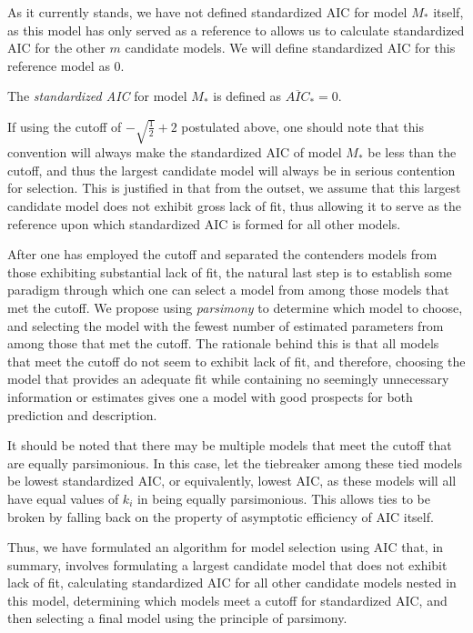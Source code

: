 		As it currently stands, we have not defined standardized AIC for model $M_*$ itself, as this model has only served as a reference to allows us to calculate standardized AIC for the
		other $m$ candidate models. We will define standardized AIC for this reference model as $0$.
		\begin{definition}
			The \textit{standardized AIC} for model $M_*$ is defined as $\overline{AIC}_* = 0$.
		\end{definition}
		If using the cutoff of $-\sqrt{\frac{1}{2}} + 2$ postulated above, one should note that this convention will always make the standardized AIC of model $M_*$ be less than the
		cutoff, and thus the largest candidate model will always be in serious contention for selection. This is justified in that from the outset, we assume that this largest
		candidate model does not exhibit gross lack of fit, thus allowing it to serve as the reference upon which standardized AIC is formed for all other models.

		After one has employed the cutoff and separated the contenders models from those exhibiting substantial lack of fit, the natural last step is to establish some paradigm
		through which one can select a model from among those models that met the cutoff. We propose using \textit{parsimony} to determine which model to choose, and selecting
		the model with the fewest number of estimated parameters from among those that met the cutoff. The rationale behind this is that all models that meet the cutoff do
		not seem to exhibit lack of fit, and therefore, choosing the model that provides an adequate fit while containing no seemingly unnecessary information or estimates
		gives one a model with good prospects for both prediction and description.
		
		It should be noted that there may be multiple models that meet the cutoff that are equally parsimonious. In this case, let the tiebreaker among these tied models be
		lowest standardized AIC, or equivalently, lowest AIC, as these models will all have equal values of $k_i$ in being equally parsimonious. This allows ties to be broken
		by falling back on the property of asymptotic efficiency of AIC itself.

		Thus, we have formulated an algorithm for model selection using AIC that, in summary, involves formulating a largest candidate model that does not exhibit lack of
		fit, calculating standardized AIC for all other candidate models nested in this model, determining which models meet a cutoff for standardized AIC, and then selecting
		a final model using the principle of parsimony.

